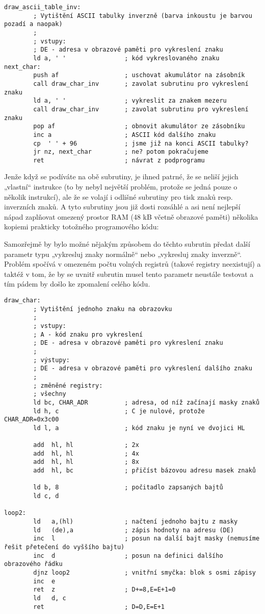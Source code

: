 \documentclass{article}
\begin{document}
\begin{verbatim}
draw_ascii_table_inv:
        ; Vytištění ASCII tabulky inverzně (barva inkoustu je barvou pozadí a naopak)
        ;       
        ; vstupy:
        ; DE - adresa v obrazové paměti pro vykreslení znaku
        ld a, ' '                ; kód vykreslovaného znaku
next_char:
        push af                  ; uschovat akumulátor na zásobník
        call draw_char_inv       ; zavolat subrutinu pro vykreslení znaku
        ld a, ' '                ; vykreslit za znakem mezeru
        call draw_char_inv       ; zavolat subrutinu pro vykreslení znaku
        pop af                   ; obnovit akumulátor ze zásobníku
        inc a                    ; ASCII kód dalšího znaku
        cp  ' ' + 96             ; jsme již na konci ASCII tabulky?
        jr nz, next_char         ; ne? potom pokračujeme
        ret                      ; návrat z podprogramu
\end{verbatim}

Jenže když se podíváte na obě subrutiny, je ihned patrné, že se neliší
jejich „vlastní`` instrukce (to by nebyl největší problém, protože se
jedná pouze o několik instrukcí), ale že se volají i odlišné subrutiny
pro tisk znaků resp. inverzních znaků. A tyto subrutiny jsou již dosti
rozsáhlé a asi není nejlepší nápad zaplňovat omezený prostor RAM (48 kB
včetně obrazové paměti) několika kopiemi prakticky totožného
programového kódu:

Samozřejmě by bylo možné nějakým způsobem do těchto subrutin předat
další parametr typu „vykresluj znaky normálně`` nebo „vykresluj znaky
inverzně``. Problém spočívá v omezeném počtu volných registrů (takové
registry neexistují) a taktéž v tom, že by se uvnitř subrutin musel
tento parametr neustále testovat a tím pádem by došlo ke zpomalení
celého kódu.

\begin{verbatim}
draw_char:
        ; Vytištění jednoho znaku na obrazovku
        ;
        ; vstupy:
        ; A - kód znaku pro vykreslení
        ; DE - adresa v obrazové paměti pro vykreslení znaku
        ;
        ; výstupy:
        ; DE - adresa v obrazové paměti pro vykreslení dalšího znaku
        ;
        ; změněné registry:
        ; všechny
        ld bc, CHAR_ADR          ; adresa, od níž začínají masky znaků
        ld h, c                  ; C je nulové, protože CHAR_ADR=0x3c00
        ld l, a                  ; kód znaku je nyní ve dvojici HL
 
        add  hl, hl              ; 2x
        add  hl, hl              ; 4x
        add  hl, hl              ; 8x
        add  hl, bc              ; přičíst bázovou adresu masek znaků
 
        ld b, 8                  ; počitadlo zapsaných bajtů
        ld c, d
 
loop2:
        ld   a,(hl)              ; načtení jednoho bajtu z masky
        ld   (de),a              ; zápis hodnoty na adresu (DE)
        inc  l                   ; posun na další bajt masky (nemusíme řešit přetečení do vyššího bajtu)
        inc  d                   ; posun na definici dalšího obrazového řádku
        djnz loop2               ; vnitřní smyčka: blok s osmi zápisy
        inc  e
        ret  z                   ; D+=8,E=E+1=0
        ld   d, c
        ret                      ; D=D,E=E+1
\end{verbatim}
\end{document}
